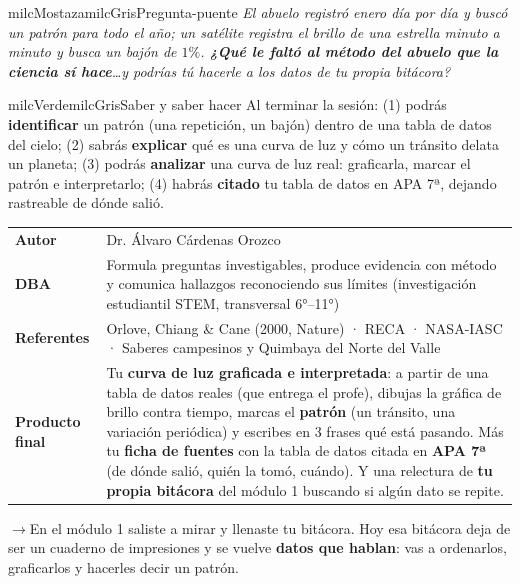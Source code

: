 \documentclass[11pt,letterpaper]{article}
\newcommand{\puente}[1]{%
  \begin{puentebox}%
    \textcolor{milcGradeDark}{$\rightarrow$}\hspace{2mm}#1%
  \end{puentebox}%
}
\begin{document}
\begin{softbox}{milcMostaza}{milcGris}{Pregunta-puente}
\textit{El abuelo registró enero día por día y buscó un patrón para todo el año; un satélite registra el brillo de una estrella minuto a minuto y busca un bajón de $1\%$. \textbf{¿Qué le faltó al método del abuelo que la ciencia sí hace}\ldots y podrías tú hacerle a los datos de tu propia bitácora?}
\end{softbox}

\begin{softbox}{milcVerde}{milcGris}{Saber y saber hacer}
Al terminar la sesión: (1) podrás \textbf{identificar} un patrón (una repetición, un bajón) dentro de una tabla de datos del cielo; (2) sabrás \textbf{explicar} qué es una curva de luz y cómo un tránsito delata un planeta; (3) podrás \textbf{analizar} una curva de luz real: graficarla, marcar el patrón e interpretarlo; (4) habrás \textbf{citado} tu tabla de datos en APA 7ª, dejando rastreable de dónde salió.
\end{softbox}



\small
\begin{tabularx}{\textwidth}{>{\bfseries}p{3.0cm}Y}
Autor & Dr. Álvaro Cárdenas Orozco\\
DBA & Formula preguntas investigables, produce evidencia con método y comunica hallazgos reconociendo sus límites (investigación estudiantil STEM, transversal 6°--11°)\\
Referentes & Orlove, Chiang \& Cane (2000, Nature) · RECA · NASA-IASC · Saberes campesinos y Quimbaya del Norte del Valle\\
Producto final & Tu \textbf{curva de luz graficada e interpretada}: a partir de una tabla de datos reales (que entrega el profe), dibujas la gráfica de brillo contra tiempo, marcas el \textbf{patrón} (un tránsito, una variación periódica) y escribes en 3 frases qué está pasando. Más tu \textbf{ficha de fuentes} con la tabla de datos citada en \textbf{APA 7ª} (de dónde salió, quién la tomó, cuándo). Y una relectura de \textbf{tu propia bitácora} del módulo 1 buscando si algún dato se repite.\\
\end{tabularx}
\normalsize

\puente{En el módulo 1 saliste a mirar y llenaste tu bitácora. Hoy esa bitácora deja de ser un cuaderno de impresiones y se vuelve \textbf{datos que hablan}: vas a ordenarlos, graficarlos y hacerles decir un patrón.}
\end{document}
